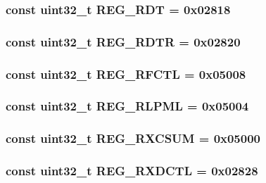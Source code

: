 \label{namespaceiGbReg_adef77c18ff90a18f8c6fe73f0e61f7fa}
\hypertarget{namespaceiGbReg_ad7ea3f0ced376d107086bfab67befbc8}{
\subsubsection[{REG\_\-RDT}]{\setlength{\rightskip}{0pt plus 5cm}const {\bf uint32\_\-t} {\bf REG\_\-RDT} = 0x02818}}
\label{namespaceiGbReg_ad7ea3f0ced376d107086bfab67befbc8}
\hypertarget{namespaceiGbReg_a345db3e807c4b47229f85d58ba1836d8}{
\subsubsection[{REG\_\-RDTR}]{\setlength{\rightskip}{0pt plus 5cm}const {\bf uint32\_\-t} {\bf REG\_\-RDTR} = 0x02820}}
\label{namespaceiGbReg_a345db3e807c4b47229f85d58ba1836d8}
\hypertarget{namespaceiGbReg_a55fd6fefe9e6e544fbf5dd7d80dd6c42}{
\subsubsection[{REG\_\-RFCTL}]{\setlength{\rightskip}{0pt plus 5cm}const {\bf uint32\_\-t} {\bf REG\_\-RFCTL} = 0x05008}}
\label{namespaceiGbReg_a55fd6fefe9e6e544fbf5dd7d80dd6c42}
\hypertarget{namespaceiGbReg_ac694a64b5dc3ed66f0a198e11c6dd561}{
\subsubsection[{REG\_\-RLPML}]{\setlength{\rightskip}{0pt plus 5cm}const {\bf uint32\_\-t} {\bf REG\_\-RLPML} = 0x05004}}
\label{namespaceiGbReg_ac694a64b5dc3ed66f0a198e11c6dd561}
\hypertarget{namespaceiGbReg_ac4ca58b53d0899d9e2cb3b6a01172029}{
\subsubsection[{REG\_\-RXCSUM}]{\setlength{\rightskip}{0pt plus 5cm}const {\bf uint32\_\-t} {\bf REG\_\-RXCSUM} = 0x05000}}
\label{namespaceiGbReg_ac4ca58b53d0899d9e2cb3b6a01172029}
\hypertarget{namespaceiGbReg_a03190c72ce8dd147689b7e671fbb3e70}{
\subsubsection[{REG\_\-RXDCTL}]{\setlength{\rightskip}{0pt plus 5cm}const {\bf uint32\_\-t} {\bf REG\_\-RXDCTL} = 0x02828}}
